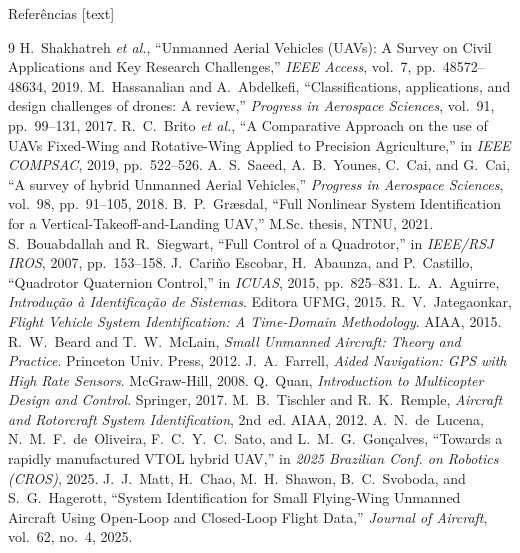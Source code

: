 \documentclass[aspectratio=169,11pt]{beamer}
\begin{document}
\begin{frame}[allowframebreaks]{Referências}
  [text]
  \footnotesize
  \begin{thebibliography}{9}
     H.~Shakhatreh \textit{et al.}, ``Unmanned Aerial Vehicles (UAVs): A Survey on Civil Applications and Key Research Challenges,'' \textit{IEEE Access}, vol.~7, pp.~48572--48634, 2019.
     M.~Hassanalian and A.~Abdelkefi, ``Classifications, applications, and design challenges of drones: A review,'' \textit{Progress in Aerospace Sciences}, vol.~91, pp.~99--131, 2017.
     R.~C.~Brito \textit{et al.}, ``A Comparative Approach on the use of UAVs Fixed-Wing and Rotative-Wing Applied to Precision Agriculture,'' in \textit{IEEE COMPSAC}, 2019, pp.~522--526.
     A.~S.~Saeed, A.~B.~Younes, C.~Cai, and G.~Cai, ``A survey of hybrid Unmanned Aerial Vehicles,'' \textit{Progress in Aerospace Sciences}, vol.~98, pp.~91--105, 2018.
     B.~P.~Græsdal, ``Full Nonlinear System Identification for a Vertical-Takeoff-and-Landing UAV,'' M.Sc. thesis, NTNU, 2021.
     S.~Bouabdallah and R.~Siegwart, ``Full Control of a Quadrotor,'' in \textit{IEEE/RSJ IROS}, 2007, pp.~153--158.
     J.~Cariño Escobar, H.~Abaunza, and P.~Castillo, ``Quadrotor Quaternion Control,'' in \textit{ICUAS}, 2015, pp.~825--831.
     L.~A.~Aguirre, \textit{Introdução à Identificação de Sistemas}. Editora UFMG, 2015.
     R.~V.~Jategaonkar, \textit{Flight Vehicle System Identification: A Time-Domain Methodology}. AIAA, 2015.
     R.~W.~Beard and T.~W.~McLain, \textit{Small Unmanned Aircraft: Theory and Practice}. Princeton Univ. Press, 2012.
     J.~A.~Farrell, \textit{Aided Navigation: GPS with High Rate Sensors}. McGraw-Hill, 2008.
     Q.~Quan, \textit{Introduction to Multicopter Design and Control}. Springer, 2017.
     M.~B.~Tischler and R.~K.~Remple, \textit{Aircraft and Rotorcraft System Identification}, 2nd~ed. AIAA, 2012.
     A.~N.~de~Lucena, N.~M.~F.~de~Oliveira, F.~C.~Y.~C.~Sato, and L.~M.~G.~Gonçalves, ``Towards a rapidly manufactured VTOL hybrid UAV,'' in \textit{2025 Brazilian Conf. on Robotics (CROS)}, 2025.
     J.~J.~Matt, H.~Chao, M.~H.~Shawon, B.~C.~Svoboda, and S.~G.~Hagerott, ``System Identification for Small Flying-Wing Unmanned Aircraft Using Open-Loop and Closed-Loop Flight Data,'' \textit{Journal of Aircraft}, vol.~62, no.~4, 2025.

\end{thebibliography}
\end{frame}
\end{document}
